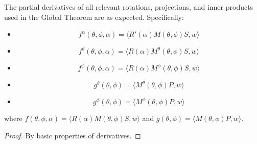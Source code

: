 \begin{lemma}
\label{lem:rotation_derivatives}
\leanok
{}
The partial derivatives of all relevant rotations, projections, and inner products
used in the Global Theorem are as expected.
Specifically:
\begin{itemize}
\item \[  f^\alpha(\theta,\phi,\alpha) = \langle R'(\alpha) M(\theta, \phi) S, w \rangle \]
\item \[  f^\theta(\theta,\phi,\alpha) = \langle R(\alpha) M^\theta(\theta, \phi) S, w \rangle \]
\item \[  f^\phi(\theta,\phi,\alpha) = \langle R(\alpha) M^\phi(\theta, \phi) S, w \rangle \]
\item \[  g^\theta(\theta,\phi) = \langle  M^\theta(\theta, \phi) P, w \rangle \]
\item \[  g^\phi(\theta,\phi) = \langle  M^\phi(\theta, \phi) P, w \rangle \]
\end{itemize}
where $f(\theta,\phi,\alpha) =  \langle R(\alpha) M(\theta,\phi) S, w\rangle $
and $g(\theta,\phi) =  \langle M(\theta,\phi) P, w\rangle $.
\end{lemma}

\begin{proof}\leanok
By basic properties of derivatives.
\end{proof}

